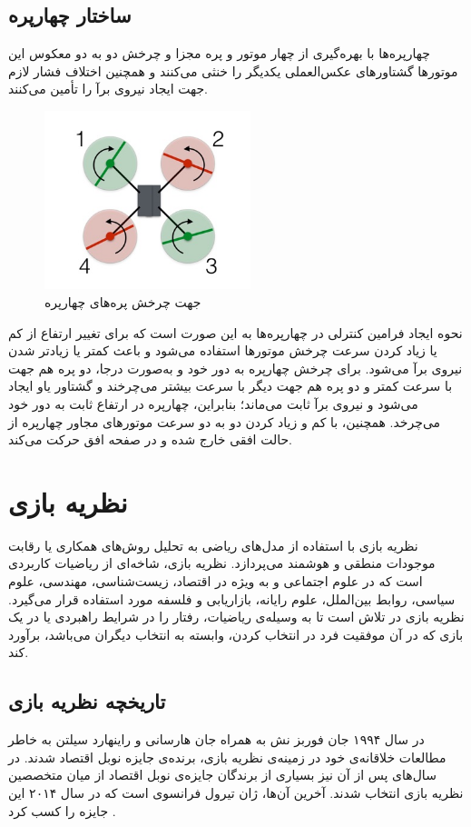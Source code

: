 \subsection{ساختار چهارپره}


چهارپره‌ها با بهره‌گیری از چهار موتور و پره مجزا و چرخش دو به دو معکوس این موتورها گشتاورهای عکس‌العملی یکدیگر را خنثی می‌کنند و همچنین اختلاف فشار لازم جهت ایجاد نیروی برآ را تأمین می‌کنند.

\begin{figure}[H]
	\includegraphics[width=6cm]{../Figures/introduction/Quadblade.jpg}
	\centering
	\caption{جهت چرخش پره‌های چهارپره
		\cite{Quadhowfly}}
\end{figure}

نحوه ایجاد فرامین کنترلی در چهارپره‌ها به این صورت است که برای تغییر ارتفاع از کم یا زیاد کردن سرعت چرخش موتورها استفاده می‌شود و باعث کمتر یا زیادتر شدن نیروی برآ می‌شود. برای چرخش چهارپره به دور خود و به‌صورت درجا، دو پره هم جهت با سرعت کمتر و دو پره هم جهت دیگر با سرعت بیشتر می‌چرخند و گشتاور یاو ایجاد می‌شود و نیروی برآ ثابت می‌ماند؛
 بنابراین، چهارپره در ارتفاع ثابت به دور خود می‌چرخد. همچنین، با کم و زیاد کردن دو به دو سرعت موتورهای مجاور چهارپره از حالت افقی خارج شده و در صفحه افق حرکت می‌کند.


\section{نظریه بازی}
نظریه بازی با استفاده از مدل‌های ریاضی به تحلیل روش‌های همکاری یا رقابت موجودات منطقی و هوشمند می‌پردازد. نظریه بازی، شاخه‌ای از ریاضیات کاربردی است که در علوم اجتماعی و به ویژه در اقتصاد، زیست‌شناسی، مهندسی، علوم سیاسی، روابط بین‌الملل، علوم رایانه، بازاریابی و فلسفه مورد استفاده قرار می‌گیرد. نظریه بازی در تلاش است تا به وسیله‌ی ریاضیات، رفتار را در شرایط راهبردی یا در یک بازی که در آن موفقیت فرد در انتخاب کردن، وابسته به انتخاب دیگران می‌باشد، برآورد کند.
\subsection{تاریخچه نظریه بازی}
در سال ۱۹۹۴ جان فوربز نش به همراه جان هارسانی و راینهارد سیلتن به خاطر مطالعات خلاقانه‌ی خود در زمینه‌ی نظریه بازی، برنده‌ی جایزه نوبل اقتصاد شدند. در سال‌های پس از آن نیز بسیاری از برندگان جایزه‌ی نوبل اقتصاد از میان متخصصین نظریه بازی انتخاب شدند. آخرین آن‌ها، ژان تیرول فرانسوی است که در سال ۲۰۱۴ این جایزه را کسب کرد \cite{nobel}.
